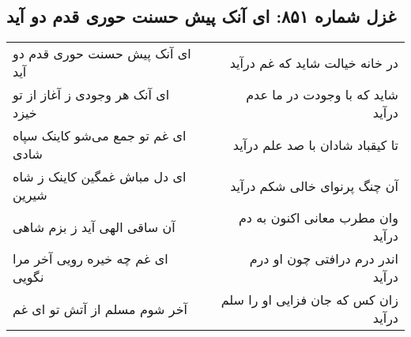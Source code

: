 \begin{center}
\section*{غزل شماره ۸۵۱: ای آنک پیش حسنت حوری قدم دو آید}
\label{sec:0851}
\begin{longtable}{l p{0.5cm} r}
ای آنک پیش حسنت حوری قدم دو آید
&&
در خانه خیالت شاید که غم درآید
\\
ای آنک هر وجودی ز آغاز از تو خیزد
&&
شاید که با وجودت در ما عدم درآید
\\
ای غم تو جمع می‌شو کاینک سپاه شادی
&&
تا کیقباد شادان با صد علم درآید
\\
ای دل مباش غمگین کاینک ز شاه شیرین
&&
آن چنگ پرنوای خالی شکم درآید
\\
آن ساقی الهی آید ز بزم شاهی
&&
وان مطرب معانی اکنون به دم درآید
\\
ای غم چه خیره رویی آخر مرا نگویی
&&
اندر درم درافتی چون او درم درآید
\\
آخر شوم مسلم از آتش تو ای غم
&&
زان کس که جان فزایی او را سلم درآید
\\
\end{longtable}
\end{center}
